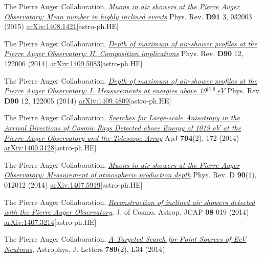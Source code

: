 \begin{etaremune}
\item {}The Pierre Auger Collaboration, \href{http://dx.doi.org/10.1103/PhysRevD.91.032003}{\emph{Muons in air showers at the Pierre Auger Observatory: Mean number in highly inclined events}} Phys. Rev. {\bf{D91}} 3, 032003 (2015) \href{http://arxiv.org/abs/1408.1421}{arXiv:1408.1421}[astro-ph.HE]

\item {}The Pierre Auger Collaboration, \href{http://dx.doi.org/10.1103/PhysRevD.90.122006}{\emph{Depth of maximum of air-shower profiles at the Pierre Auger Observatory: II. Composition implications}} Phys. Rev. {\bf{D90}} 12, 122006 (2014) \href{http://arxiv.org/abs/1409.5083}{arXiv:1409.5083}[astro-ph.HE]

\item {}The Pierre Auger Collaboration, \href{http://dx.doi.org/10.1103/PhysRevD.90.122005}{\emph{Depth of maximum of air-shower profiles at the Pierre Auger Observatory: I. Measurements at energies above 10$^{17.8}$\,eV}} Phys. Rev. {\bf{D90}} 12, 122005 (2014) \href{http://arxiv.org/abs/1409.4809}{arXiv:1409.4809}[astro-ph.HE]

\item {}The Pierre Auger Collaboration, \href{http://dx.doi.org/10.1088/0004-637X/794/2/172}{\emph{Searches for Large-scale Anisotropy in the Arrival Directions of Cosmic Rays Detected above Energy of 1019 eV at the Pierre Auger Observatory and the Telescope Array}} ApJ {\bf{794}}(2), 172 (2014) \href{http://arxiv.org/abs/1409.3128}{arXiv:1409.3128}[astro-ph.HE]

\item {}The Pierre Auger Collaboration, \href{http://journals.aps.org/prd/abstract/10.1103/PhysRevD.90.012012}{\emph{Muons in air showers at the Pierre Auger Observatory: Measurement of atmospheric production depth}} Phys. Rev. D {\bf{90}}(1), 012012 (2014) \href{http://arxiv.org/abs/1407.5919}{arXiv:1407.5919}[astro-ph.HE]

\item {}The Pierre Auger Collaboration, \href{http://dx.doi.org/10.1088/1475-7516/2014/08/019}{\emph{Reconstruction of inclined air showers detected with the Pierre Auger Observatory}}, J. of Cosmo. Astrop. JCAP {\bf{08}} 019 (2014) \href{http://arxiv.org/abs/1407.3214}{arXiv:1407.3214}[astro-ph.HE]
  
\item {}The Pierre Auger Collaboration, \href{http://iopscience.iop.org/2041-8205/789/2/L34}{\emph{A Targeted Search for Point Sources of EeV Neutrons}}, Astrophys. J. Letters {\bf{789}}(2), L34 (2014)


\end{etaremune}
